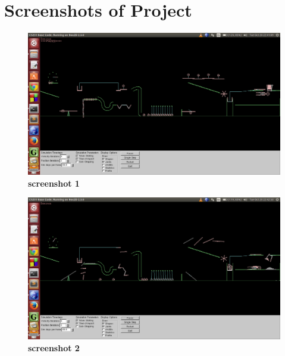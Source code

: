 \chapter{Screenshots of Project}
\vspace{2cm}
\begin{figure}[H]
  \centering
    \includegraphics[scale=0.2]{project/images/screenshot.png}
  \caption{\textbf{screenshot 1}}
\end{figure}
\begin{figure}[H]
  \centering
    \includegraphics[scale=0.2]{project/images/screen.png}
  \caption{\textbf{screenshot 2}}
\end{figure}
